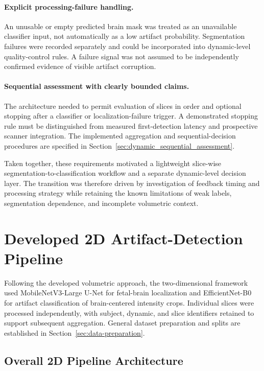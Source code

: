\paragraph{Explicit processing-failure handling.}
An unusable or empty predicted brain mask was treated as an unavailable classifier input, not automatically as a low artifact probability. Segmentation failures were recorded separately and could be incorporated into dynamic-level quality-control rules. A failure signal was not assumed to be independently confirmed evidence of visible artifact corruption.

\paragraph{Sequential assessment with clearly bounded claims.}
The architecture needed to permit evaluation of slices in order and optional stopping after a classifier or localization-failure trigger. A demonstrated stopping rule must be distinguished from measured first-detection latency and prospective scanner integration. The implemented aggregation and sequential-decision procedures are specified in Section~\ref{sec:dynamic_sequential_assessment}.

Taken together, these requirements motivated a lightweight slice-wise segmentation-to-classification workflow and a separate dynamic-level decision layer. The transition was therefore driven by investigation of feedback timing and processing strategy while retaining the known limitations of weak labels, segmentation dependence, and incomplete volumetric context.

\section{Developed 2D Artifact-Detection Pipeline}
\label{sec:developed_2d_pipeline}

Following the developed volumetric approach, the two-dimensional framework used MobileNetV3-Large U-Net for fetal-brain localization and EfficientNet-B0 for artifact classification of brain-centered intensity crops. Individual slices were processed independently, with subject, dynamic, and slice identifiers retained to support subsequent aggregation. General dataset preparation and splits are established in Section~\ref{sec:data-preparation}.

\subsection{Overall 2D Pipeline Architecture}
\label{subsec:2d_overall_architecture}

